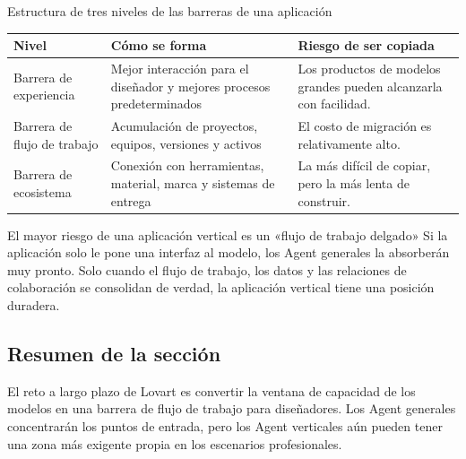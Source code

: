 \begin{knowledgebox}{Estructura de tres niveles de las barreras de una aplicación}
\begin{tabularx}{\textwidth}{p{}p{}X}
\toprule
Nivel & Cómo se forma & Riesgo de ser copiada \\
\midrule
Barrera de experiencia & Mejor interacción para el diseñador y mejores procesos predeterminados & Los productos de modelos grandes pueden alcanzarla con facilidad. \\
Barrera de flujo de trabajo & Acumulación de proyectos, equipos, versiones y activos & El costo de migración es relativamente alto. \\
Barrera de ecosistema & Conexión con herramientas, material, marca y sistemas de entrega & La más difícil de copiar, pero la más lenta de construir. \\
\bottomrule
\end{tabularx}
\end{knowledgebox}

\begin{warningbox}{El mayor riesgo de una aplicación vertical es un «flujo de trabajo delgado»}
Si la aplicación solo le pone una interfaz al modelo, los Agent generales la absorberán muy pronto. Solo cuando el flujo de trabajo, los datos y las relaciones de colaboración se consolidan de verdad, la aplicación vertical tiene una posición duradera.
\end{warningbox}

\subsection{Resumen de la sección}

El reto a largo plazo de Lovart es convertir la ventana de capacidad de los modelos en una barrera de flujo de trabajo para diseñadores. Los Agent generales concentrarán los puntos de entrada, pero los Agent verticales aún pueden tener una zona más exigente propia en los escenarios profesionales.
